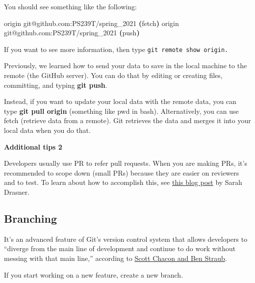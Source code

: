 \documentclass[
]{book}
\newenvironment{Shaded}{\begin{snugshade}}{\end{snugshade}}
\newcommand{\ErrorTok}[1]{\textcolor[rgb]{0.64,0.00,0.00}{\textbf{#1}}}
\newcommand{\ExtensionTok}[1]{#1}
\newcommand{\KeywordTok}[1]{\textcolor[rgb]{0.13,0.29,0.53}{\textbf{#1}}}
\newcommand{\NormalTok}[1]{#1}
\begin{document}
You should see something like the following:

\begin{Shaded}
\begin{Highlighting}[]
\ExtensionTok{origin}\NormalTok{  git@github.com:PS239T/spring\_2021 }\ErrorTok{(}\ExtensionTok{fetch}\KeywordTok{)}
\ExtensionTok{origin}\NormalTok{  git@github.com:PS239T/spring\_2021 }\ErrorTok{(}\ExtensionTok{push}\KeywordTok{)}
\end{Highlighting}
\end{Shaded}

If you want to see more information, then type \texttt{git\ remote\ show\ origin.}

Previously, we learned how to send your data to save in the local machine to the remote (the GitHub server). You can do that by editing or creating files, committing, and typing \textbf{git push}.

Instead, if you want to update your local data with the remote data, you can type \textbf{git pull origin} (something like pwd in bash). Alternatively, you can use fetch (retrieve data from a remote). Git retrieves the data and merges it into your local data when you do that.

\begin{Shaded}
\end{Shaded}

\textbf{Additional tips 2}

Developers usually use PR to refer pull requests. When you are making PRs, it's recommended to scope down (small PRs) because they are easier on reviewers and to test. To learn about how to accomplish this, see \href{https://www.netlify.com/blog/2020/03/31/how-to-scope-down-prs/}{this blog post} by Sarah Drasner.

\subsection{Branching}\label{branching}

It's an advanced feature of Git's version control system that allows developers to ``diverge from the main line of development and continue to do work without messing with that main line,'' according to \href{https://git-scm.com/book/en/v1/Git-Branching}{Scott Chacon and Ben Straub}.

If you start working on a new feature, create a new branch.
\end{document}
